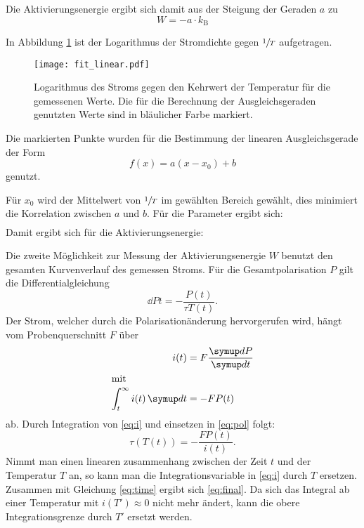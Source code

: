 Die Aktivierungsenergie ergibt sich damit aus der Steigung der Geraden $a$ zu
\begin{equation}
  W = - a \cdot k_\text{B}
\end{equation}

In Abbildung \ref{fig:lnj} ist der Logarithmus der Stromdichte gegen $\sfrac{1}{T}$ aufgetragen.

\begin{figure}
  \texttt{[image: fit\_linear.pdf]}
  \caption{%
    Logarithmus des Stroms gegen den Kehrwert der Temperatur für die gemessenen Werte.
    Die für die Berechnung der Ausgleichsgeraden genutzten Werte sind in bläulicher Farbe markiert.
  }
  \label{fig:lnj}
\end{figure}

Die markierten Punkte wurden für die Bestimmung der linearen Ausgleichsgerade der Form
\begin{equation}
  f(x) = a (x - x_0) + b
\end{equation}
genutzt.

Für $x_0$ wird der Mittelwert von $\sfrac{1}{T}$ im gewählten Bereich gewählt, dies minimiert die Korrelation zwischen $a$ und $b$.
Für die Parameter ergibt sich:
\begin{align}
  
\end{align}
Damit ergibt sich für die Aktivierungsenergie:
\begin{equation}
  
\end{equation}


Die zweite Möglichkeit zur Messung der Aktivierungsenergie $W$ benutzt den gesamten Kurvenverlauf des gemessen Stroms.
Für die Gesamtpolarisation $P$ gilt die Differentialgleichung
\begin{equation}
  \dd{P}{t} = - \frac{P(t)}{\tau{T(t)}}.
  \label{eq:pol}
\end{equation}
Der Strom, welcher durch die Polarisationänderung hervorgerufen wird, hängt vom Probenquerschnitt $F$ über
\begin{align}
  i(t) &= F \dd{P}{t} \\
  \shortintertext{mit}
  \int_t^{\infty} i(t) \dif{t} &= -FP(t)
  \label{eq:i}
\end{align}
ab.
Durch Integration von  \eqref{eq:i} und einsetzen in \eqref{eq:pol} folgt:
\begin{equation}
  \tau(T(t)) = -\frac{F P(t)}{i(t)}.
  \label{eq:tau_t}
\end{equation}
Nimmt man einen linearen zusammenhang zwischen der Zeit $t$ und der Temperatur $T$ an, so kann man die Integrationsvariable in \eqref{eq:i} durch $T$ ersetzen.
Zusammen mit Gleichung \eqref{eq:time} ergibt sich \eqref{eq:final}. Da sich das Integral ab einer Temperatur mit $i(T') \approx 0$ nicht mehr ändert,
kann die obere Integrationsgrenze durch $T'$ ersetzt werden.

